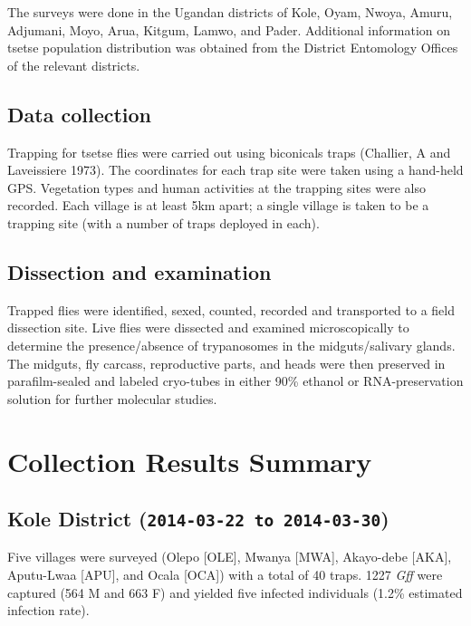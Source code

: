 \documentclass[letterpaper]{report}
\begin{document}
The surveys were done in the Ugandan districts of Kole, Oyam, Nwoya,
Amuru, Adjumani, Moyo, Arua, Kitgum, Lamwo, and Pader. Additional
information on tsetse population distribution was obtained from the
District Entomology Offices of the relevant districts.

\subsection{Data collection}\label{data-collection}

Trapping for tsetse flies were carried out using biconicals traps
({Challier, A and Laveissiere} 1973). The coordinates for each trap site
were taken using a hand-held GPS. Vegetation types and human activities
at the trapping sites were also recorded. Each village is at least 5km
apart; a single village is taken to be a trapping site (with a number of
traps deployed in each).

\subsection{Dissection and
examination}\label{dissection-and-examination}

Trapped flies were identified, sexed, counted, recorded and transported
to a field dissection site. Live flies were dissected and examined
microscopically to determine the presence/absence of trypanosomes in the
midguts/salivary glands. The midguts, fly carcass, reproductive parts,
and heads were then preserved in parafilm-sealed and labeled cryo-tubes
in either 90\% ethanol or RNA-preservation solution for further
molecular studies.

\section{Collection Results Summary}\label{collection-results-summary}

\subsection{Kole District
(\texttt{2014-03-22 to 2014-03-30})}\label{kole-district-2014-03-22-to-2014-03-30}

Five villages were surveyed (Olepo {[}OLE{]}, Mwanya {[}MWA{]},
Akayo-debe {[}AKA{]}, Aputu-Lwaa {[}APU{]}, and Ocala {[}OCA{]}) with a
total of 40 traps. 1227 \emph{Gff} were captured (564 M and 663 F) and
yielded five infected individuals (1.2\% estimated infection rate).
\end{document}
